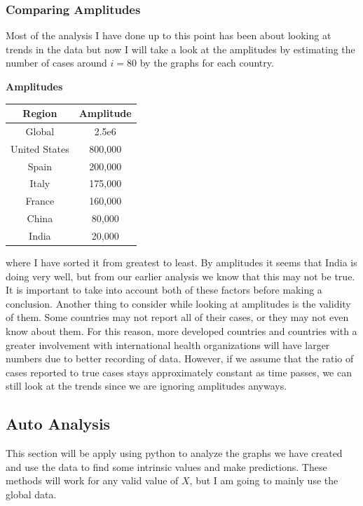 \documentclass{report}
\begin{document}
            \subsubsection{Comparing Amplitudes}
                Most of the analysis I have done up to this point has been about looking at trends in the data but now I will take a look at the amplitudes by estimating the number of cases around $i = 80$ by the graphs for each country.
                \begin{center}
                    \textbf{Amplitudes}
                    \begin{tabular}{||c | c||}
                        \hline
                        Region & Amplitude \\
                        \hline\hline
                        Global & 2.5e6 \\
                        United States & 800,000 \\
                        Spain & 200,000 \\
                        Italy & 175,000 \\
                        France & 160,000 \\
                        China & 80,000 \\
                        India & 20,000 \\
                        \hline
                    \end{tabular}
                \end{center}
                where I have sorted it from greatest to least. By amplitudes it seems that India is doing very well, but from our earlier analysis we know that this may not be true. It is important to take into account both of these factors before making a conclusion.
                \newline\indent
                Another thing to consider while looking at amplitudes is the validity of them. Some countries may not report all of their cases, or they may not even know about them. For this reason, more developed countries and countries with a greater involvement with international health organizations will have larger numbers due to better recording of data. However, if we assume that the ratio of cases reported to true cases stays approximately constant as time passes, we can still look at the trends since we are ignoring amplitudes anyways.
        \subsection{Auto Analysis}
        \label{sec:auto}
            This section will be apply using python to analyze the graphs we have created and use the data to find some intrinsic values and make predictions. These methods will work for any valid value of $X$, but I am going to mainly use the global data. 
\end{document}
